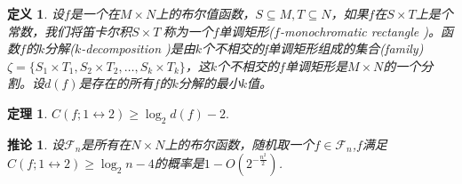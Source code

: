 \documentclass[]{article}
\newtheorem{theorem}{定理}
\newtheorem{definition}{定义}
\newtheorem{corollary}{推论}
\begin{document}
	\begin{definition}\footnotemark
		设$f$是一个在$M\times N$上的布尔值函数，$S\subseteq M,T\subseteq N$，如果$f$在$S\times T$上是个常数，我们将笛卡尔积$S\times T\ $称为一个$f$单调矩形($f$-monochromatic rectangle )。函数$f$的$k$分解($k$-decomposition )是由$k$个不相交的f单调矩形组成的集合(family)$\zeta=\{S_1\times T_1,S_2\times T_2,\ldots,S_k\times T_k\}$，这$k$个不相交的$f$单调矩形是$M\times N$的一个分割。设$d(f)$是存在的所有$f$的$k$分解的最小$k$值。
	\end{definition}
	
	
	\begin{theorem}\label{th1}\footnotemark
		 $C(f;1\leftrightarrow 2) \geq \log_2{d(f) -2} .$
	\end{theorem}
	
	
	\begin{corollary}\label{coro1}
		设$\mathscr{F}_n$是所有在$N\times N$上的布尔函数，随机取一个$f\in \mathscr{F}_n$,$f$满足$C(f;1\leftrightarrow 2)\geq \log_2 n -4$的概率是$1-O(2^{-\frac{n^2}{2}})$.
	\end{corollary}
	
\end{document}
